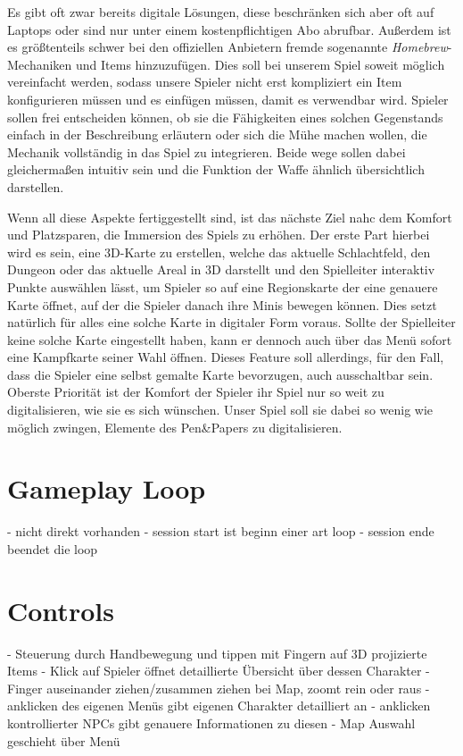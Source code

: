 \documentclass[11pt]{article}
\begin{document}
    Es gibt oft zwar bereits digitale Lösungen, diese beschränken sich aber oft auf Laptops
    oder sind nur unter einem kostenpflichtigen Abo abrufbar.
    Außerdem ist es größtenteils schwer bei den offiziellen Anbietern fremde sogenannte \textit{Homebrew}-Mechaniken
    und Items hinzuzufügen.
    Dies soll bei unserem Spiel soweit möglich vereinfacht werden, sodass unsere Spieler nicht erst kompliziert
    ein Item konfigurieren müssen und es einfügen müssen, damit es verwendbar wird.
    Spieler sollen frei entscheiden können, ob sie die Fähigkeiten eines solchen Gegenstands einfach
    in der Beschreibung erläutern oder sich die Mühe machen wollen, die Mechanik vollständig in das
    Spiel zu integrieren.
    Beide wege sollen dabei gleichermaßen intuitiv sein und die Funktion der Waffe ähnlich
    übersichtlich darstellen.\n

    Wenn all diese Aspekte fertiggestellt sind, ist das nächste Ziel nahc dem Komfort und Platzsparen, die Immersion des
    Spiels zu erhöhen.\n
    Der erste Part hierbei wird es sein, eine 3D-Karte zu erstellen, welche das aktuelle Schlachtfeld, den Dungeon oder
    das aktuelle Areal in 3D darstellt und den Spielleiter interaktiv Punkte auswählen lässt, um Spieler so auf eine
    Regionskarte der eine genauere Karte öffnet, auf der die Spieler danach ihre Minis bewegen können.
    Dies setzt natürlich für alles eine solche Karte in digitaler Form voraus.
    Sollte der Spielleiter keine solche Karte eingestellt haben, kann er dennoch auch über das Menü sofort
    eine Kampfkarte seiner Wahl öffnen.
    Dieses Feature soll allerdings, für den Fall, dass die Spieler eine selbst gemalte Karte bevorzugen, auch
    ausschaltbar sein.
    Oberste Priorität ist der Komfort der Spieler ihr Spiel nur so weit zu digitalisieren, wie sie es sich wünschen.
    Unser Spiel soll sie dabei so wenig wie möglich zwingen, Elemente des Pen\&Papers zu digitalisieren.




    \section{Gameplay Loop}
    - nicht direkt vorhanden
    - session start ist beginn einer art loop
    - session ende beendet die loop

    \section{Controls}
    - Steuerung durch Handbewegung und tippen mit Fingern auf 3D projizierte Items
    - Klick auf Spieler öffnet detaillierte Übersicht über dessen Charakter
    - Finger auseinander ziehen/zusammen ziehen bei Map, zoomt rein oder raus
    - anklicken des eigenen Menüs gibt eigenen Charakter detailliert an
    - anklicken kontrollierter NPCs gibt genauere Informationen zu diesen
    - Map Auswahl geschieht über Menü
\end{document}
